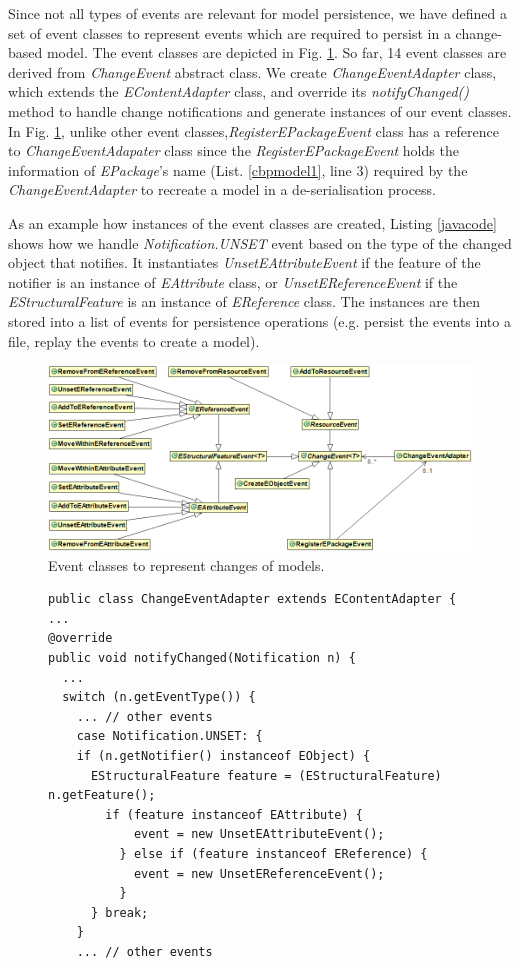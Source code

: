 \documentclass{llncs}
\begin{document}
Since not all types of events are relevant for model persistence, we have defined a set of event classes to represent events which are required to persist in a change-based model. The event classes are depicted in Fig. \ref{events}. So far, 14 event classes are derived from \emph{ChangeEvent} abstract class. We create \emph{ChangeEventAdapter} class, which extends the \emph{EContentAdapter} class, and override its \emph{notifyChanged()} method to handle change notifications and generate instances of our event classes. In Fig. \ref{events}, unlike other event classes,\emph{RegisterEPackageEvent} class has a reference to \emph{ChangeEventAdapater} class since the \emph{RegisterEPackageEvent} holds the information of \emph{EPackage}'s name (List. \ref{cbpmodel1}, line 3) required by the \emph{ChangeEventAdapter} to recreate a model in a de-serialisation process. 

As an example how instances of the event classes are created, Listing \ref{javacode} shows how we handle \emph{Notification.UNSET} event based on the type of the changed object that notifies. It instantiates \emph{UnsetEAttributeEvent} if the feature of the notifier is an instance of \emph{EAttribute} class, or \emph{UnsetEReferenceEvent}  if the \emph{EStructuralFeature} is an instance of \emph{EReference} class. The instances are then stored into a list of events for persistence operations (e.g. persist the events into a file, replay the events to create a model). 

\begin{figure}[t!]
\centering
\includegraphics[width=\linewidth]{events}
\caption{Event classes to represent changes of models.}
\label{events}
\end{figure}

\begin{figure}[t!]
\begin{lstlisting}[style=java,caption={Simplified Java code to handle notification events.},label=javacode]
public class ChangeEventAdapter extends EContentAdapter {
...
@override
public void notifyChanged(Notification n) {
  ...
  switch (n.getEventType()) {
    ... // other events
    case Notification.UNSET: {
    if (n.getNotifier() instanceof EObject) {
      EStructuralFeature feature = (EStructuralFeature) n.getFeature();
        if (feature instanceof EAttribute) {
            event = new UnsetEAttributeEvent();
          } else if (feature instanceof EReference) {
            event = new UnsetEReferenceEvent();
          }
      } break;
    } 
    ... // other events
\end{lstlisting}	
\end{figure}
\end{document}
